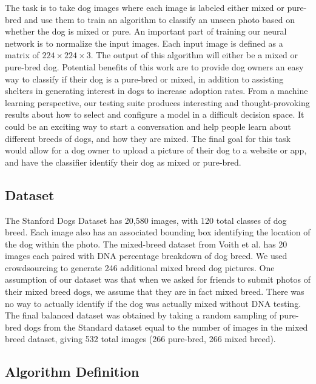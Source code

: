 \documentclass[12pt]{article}
\begin{document}
The task is to take dog images where each image is labeled either mixed or pure-bred and use them to train an algorithm to classify an unseen photo based on whether the dog is mixed or pure. An important part of training our neural network is to normalize the input images. Each input image is defined as a matrix of $224\times 224\times3$. The output of this algorithm will either be a mixed or pure-bred dog. Potential benefits of this work are to provide dog owners an easy way to classify if their dog is a pure-bred or mixed, in addition to assisting shelters in generating interest in dogs to increase adoption rates. From a machine learning perspective, our testing suite produces interesting and thought-provoking results about how to select and configure a model in a difficult decision space. It could be an exciting way to start a conversation and help people learn about different breeds of dogs, and how they are mixed. The final goal for this task would allow for a dog owner to upload a picture of their dog to a website or app, and have the classifier identify their dog as mixed or pure-bred.

\subsection{Dataset}

The Stanford Dogs Dataset has 20,580 images, with 120 total classes of dog breed. \cite{khosla2011novel} Each image also has an associated bounding box identifying the location of the dog within the photo. The mixed-breed dataset from Voith et al. \cite{voith2009comparison} has 20 images each paired with DNA percentage breakdown of dog breed. We used crowdsourcing to generate 246 additional mixed breed dog pictures. One assumption of our dataset was that when we asked for friends to submit photos of their mixed breed dogs, we assume that they are in fact mixed breed. There was no way to actually identify if the dog was actually mixed without DNA testing. The final balanced dataset was obtained by taking a random sampling of pure-bred dogs from the Standard dataset equal to the number of images in the mixed breed dataset, giving 532 total images (266 pure-bred, 266 mixed breed). 

\subsection{Algorithm Definition}
\end{document}

